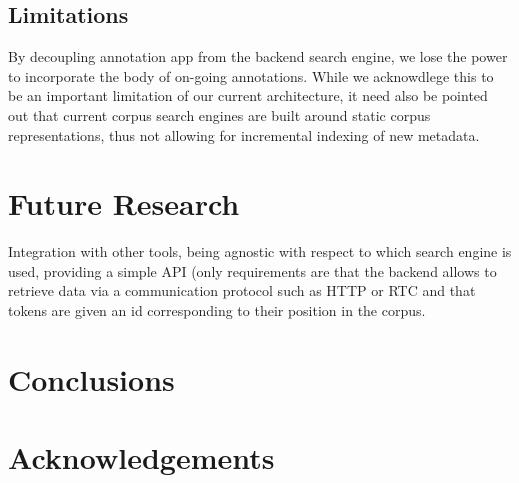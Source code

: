 \documentclass{sig-alternate}
\begin{document}
\subsection{Limitations}
By decoupling annotation app from the backend search engine, we lose the power to incorporate
the body of on-going annotations.
While we acknowdlege this to be an important limitation of our current architecture, it need
also be pointed out that current corpus search engines are built around static corpus
representations, thus not allowing for incremental indexing of new metadata.

\section{Future Research}\label{sec:future}
Integration with other tools, being agnostic with respect to which search engine is used,
providing a simple API (only requirements are that the backend allows to retrieve data via
a communication protocol such as HTTP or RTC and that tokens are given an id corresponding
to their position in the corpus.

\section{Conclusions}\label{sec:conclusion}

\section{Acknowledgements}



%
%

\end{document}
